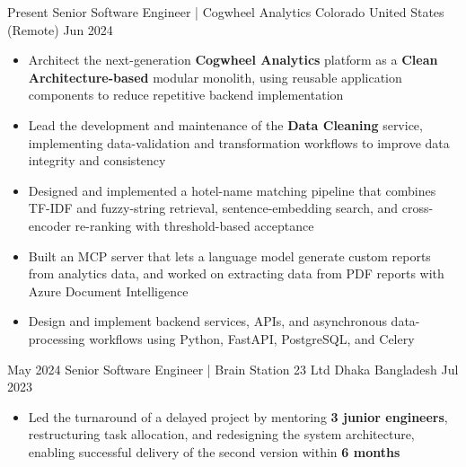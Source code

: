 %
%
%


\begin{experiences}

    \experience
    {Present}
    {Senior Software Engineer | Cogwheel Analytics}
    {Colorado}
    {United States (Remote)}
    {Jun 2024}
    {
        \begin{itemize}
            \item Architect the next-generation \textbf{Cogwheel Analytics} platform as a 
            \textbf{Clean Architecture-based} modular monolith, using reusable application
             components to reduce repetitive backend implementation
            
            \item Lead the development and maintenance of the \textbf{Data Cleaning}
                  service, implementing data-validation and transformation workflows
                  to improve data integrity and consistency

            \item Designed and implemented a hotel-name matching pipeline that combines
                  TF-IDF and fuzzy-string retrieval, sentence-embedding search, and
                  cross-encoder re-ranking with threshold-based acceptance

            \item Built an MCP server that lets a language model generate custom reports
                  from analytics data, and worked on extracting data from PDF reports with
                  Azure Document Intelligence

            \item Design and implement backend services, APIs, and asynchronous
                  data-processing workflows using Python, FastAPI, PostgreSQL, and Celery
        \end{itemize}
    }
    {}
    
    \emptySeparator

    \experience
        {May 2024}
        {Senior Software Engineer | Brain Station 23 Ltd}
        {Dhaka}
        {Bangladesh}
        {Jul 2023}
        {
            \begin{itemize}
                \item Led the turnaround of a delayed project by mentoring
                      \textbf{3 junior engineers}, restructuring task allocation,
                      and redesigning the system architecture, enabling successful
                      delivery of the second version within \textbf{6 months}


\end{itemize}}
\end{experiences}
